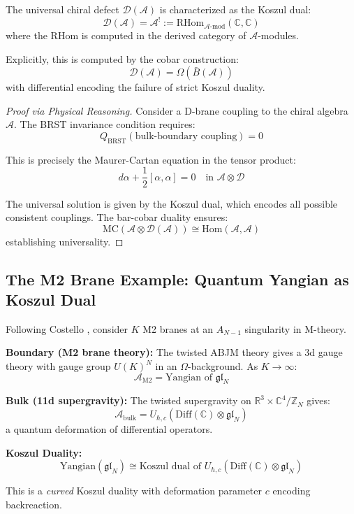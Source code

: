 \begin{theorem}[Universal Defect = Koszul Dual]\label{thm:defect-koszul}
The universal chiral defect $\mathcal{D}(\mathcal{A})$ is characterized as the Koszul dual:
$$\mathcal{D}(\mathcal{A}) = \mathcal{A}^! := \text{RHom}_{\mathcal{A}\text{-mod}}(\mathbb{C}, \mathbb{C})$$
where the RHom is computed in the derived category of $\mathcal{A}$-modules.

Explicitly, this is computed by the cobar construction:
$$\mathcal{D}(\mathcal{A}) = \Omega(\bar{B}(\mathcal{A}))$$
with differential encoding the failure of strict Koszul duality.
\end{theorem}

\begin{proof}[Proof via Physical Reasoning]
Consider a D-brane coupling to the chiral algebra $\mathcal{A}$. The BRST invariance condition requires:
$$Q_{\text{BRST}}(\text{bulk-boundary coupling}) = 0$$

This is precisely the Maurer-Cartan equation in the tensor product:
$$d\alpha + \frac{1}{2}[\alpha, \alpha] = 0 \quad \text{in } \mathcal{A} \otimes \mathcal{D}$$

The universal solution is given by the Koszul dual, which encodes all possible consistent couplings. The bar-cobar duality ensures:
$$\text{MC}(\mathcal{A} \otimes \mathcal{D}(\mathcal{A})) \cong \text{Hom}(\mathcal{A}, \mathcal{A})$$
establishing universality.
\end{proof}

\subsection{The M2 Brane Example: Quantum Yangian as Koszul Dual}

\begin{example}\label{ex:M2-brane}
Following Costello \cite{Costello2017}, consider $K$ M2 branes at an $A_{N-1}$ singularity in M-theory.

\textbf{Boundary (M2 brane theory):}
The twisted ABJM theory gives a 3d gauge theory with gauge group $U(K)^N$ in an $\Omega$-background. As $K \to \infty$:
$$\mathcal{A}_{\text{M2}} = \text{Yangian of } \mathfrak{gl}_N$$

\textbf{Bulk (11d supergravity):}
The twisted supergravity on $\mathbb{R}^3 \times \mathbb{C}^4/\mathbb{Z}_N$ gives:
$$\mathcal{A}_{\text{bulk}} = U_{\hbar,c}(\text{Diff}(\mathbb{C}) \otimes \mathfrak{gl}_N)$$
a quantum deformation of differential operators.

\textbf{Koszul Duality:}
$$\boxed{\text{Yangian}(\mathfrak{gl}_N) \cong \text{Koszul dual of } U_{\hbar,c}(\text{Diff}(\mathbb{C}) \otimes \mathfrak{gl}_N)}$$

This is a \emph{curved} Koszul duality with deformation parameter $c$ encoding backreaction.
\end{example}

